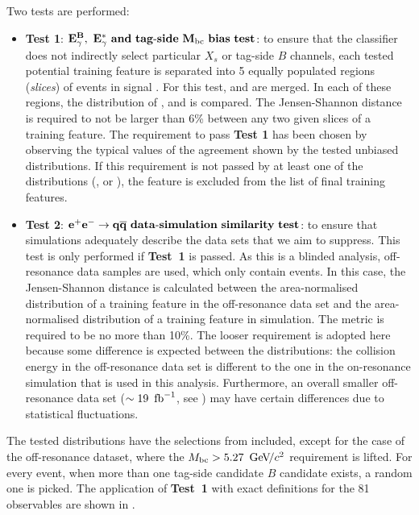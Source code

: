 Two tests are performed:
\begin{itemize}
    \item \textbf{Test 1}: $\mathbf{{E^B_{\gamma}},~{E^*_{\gamma}}~and~tag\mbox{-}side~{M_{\mathrm{bc}}}~bias~test}$:
    to ensure that the classifier does not indirectly select particular $X_s$ or tag-side $B$ channels,
    each tested potential training feature is separated into 5 equally populated regions (\textit{slices}) of \BtoXsgamma events in signal \MC.
    For this test, \BptoXsgamma and \BztoXsgamma are merged.
    In each of these regions, the distribution of \EB, \Estar and \Mbc is compared.
    The Jensen-Shannon distance is required to not be larger than 6\% between any two given slices of a training feature.
    The requirement to pass \textbf{Test 1} has been chosen by observing the typical values of the agreement shown by the tested unbiased distributions.
    If this requirement is not passed by at least one of the distributions (\EB, \Estar or \Mbc), the feature is excluded from the list of final \BDT training features.
    \item \textbf{Test 2}: $\mathbf{e^+e^-\rightarrow q\overline q~data\mbox{-}simulation~similarity~test}$:
    to ensure that simulations adequately describe the data sets that we aim to suppress.
    This test is only performed if \textbf{Test~1} is passed.
    As this is a blinded analysis, off-resonance data samples are used, which only contain \epem\ra\qqbar events.
    In this case, the Jensen-Shannon distance is calculated between 
    the area-normalised distribution of a training feature in the off-resonance data set
    and the area-normalised distribution of a training feature in \epem\ra\qqbar simulation.
    The metric is required to be no more than 10\%.
    The looser requirement is adopted here because some difference is expected between the distributions:
    the collision energy in the off-resonance data set is different to the one in the on-resonance simulation that is used in this analysis.
    Furthermore, an overall smaller off-resonance data set ($\sim19~\mbox{\,fb}^{-1}$, see ) may have certain differences due to statistical fluctuations.
\end{itemize}

The tested distributions have the selections from  included, except for the case of the off-resonance dataset, where the ${M_{\mathrm{bc}}}>5.27~{\mathrm{\,Ge\kern -0.1em V\!/}c^2}$ requirement is lifted.
For every event, when more than one tag-side candidate $B$ candidate exists, a random one is picked.
The application of \textbf{Test~1} with exact definitions for the 81 observables are shown in .

